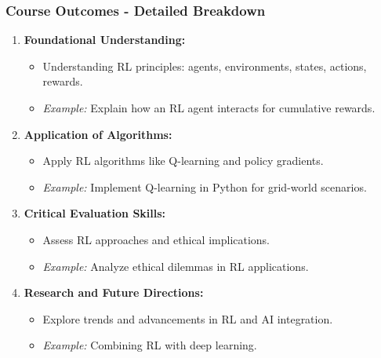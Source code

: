 \documentclass[aspectratio=169]{beamer}
\begin{document}
\begin{frame}[fragile]
    \frametitle{Course Outcomes - Detailed Breakdown}
    \begin{enumerate}
        \item \textbf{Foundational Understanding:}
        \begin{itemize}
            \item Understanding RL principles: agents, environments, states, actions, rewards.
            \item \textit{Example:} Explain how an RL agent interacts for cumulative rewards.
        \end{itemize}
        
        \item \textbf{Application of Algorithms:}
        \begin{itemize}
            \item Apply RL algorithms like Q-learning and policy gradients.
            \item \textit{Example:} Implement Q-learning in Python for grid-world scenarios.
        \end{itemize}
        
        \item \textbf{Critical Evaluation Skills:}
        \begin{itemize}
            \item Assess RL approaches and ethical implications.
            \item \textit{Example:} Analyze ethical dilemmas in RL applications.
        \end{itemize}
        
        \item \textbf{Research and Future Directions:}
        \begin{itemize}
            \item Explore trends and advancements in RL and AI integration.
            \item \textit{Example:} Combining RL with deep learning.
        \end{itemize}
    \end{enumerate}
\end{frame}
\end{document}

